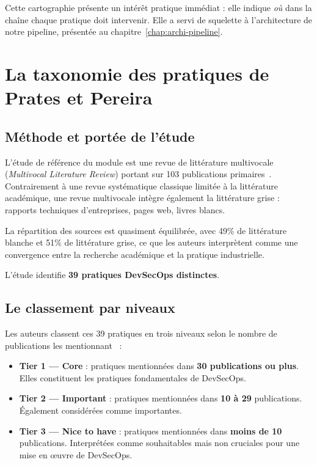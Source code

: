 Cette cartographie présente un intérêt pratique immédiat : elle indique
\emph{où} dans la chaîne chaque pratique doit intervenir. Elle a servi de
squelette à l'architecture de notre pipeline, présentée au
chapitre~\ref{chap:archi-pipeline}.

\section{La taxonomie des pratiques de Prates et Pereira}

\subsection{Méthode et portée de l'étude}

L'étude de référence du module est une revue de littérature multivocale
(\emph{Multivocal Literature Review}) portant sur 103 publications
primaires~\cite{prates2025}. Contrairement à une revue systématique classique
limitée à la littérature académique, une revue multivocale intègre également la
littérature grise : rapports techniques d'entreprises, pages web, livres
blancs.

La répartition des sources est quasiment équilibrée, avec 49\% de littérature
blanche et 51\% de littérature grise, ce que les auteurs interprètent comme une
convergence entre la recherche académique et la pratique industrielle.

L'étude identifie \textbf{39 pratiques DevSecOps distinctes}.

\subsection{Le classement par niveaux}

Les auteurs classent ces 39 pratiques en trois niveaux selon le nombre de
publications les mentionnant~\cite{prates2025} :

\begin{itemize}
  \item \textbf{Tier 1 --- Core} : pratiques mentionnées dans \textbf{30
  publications ou plus}. Elles constituent les pratiques fondamentales de
  DevSecOps.
  \item \textbf{Tier 2 --- Important} : pratiques mentionnées dans
  \textbf{10 à 29} publications. Également considérées comme importantes.
  \item \textbf{Tier 3 --- Nice to have} : pratiques mentionnées dans
  \textbf{moins de 10} publications. Interprétées comme souhaitables mais non
  cruciales pour une mise en œuvre de DevSecOps.
\end{itemize}

